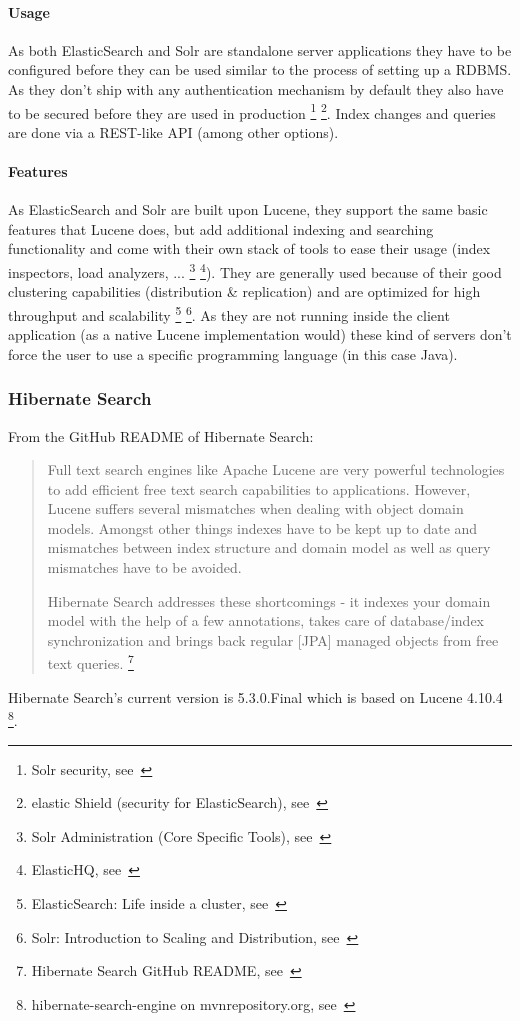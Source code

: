 \paragraph{Usage}
As both ElasticSearch and Solr are standalone server applications they have to be configured before they can be used similar to the process of setting up a RDBMS. As they don't ship with any authentication mechanism by default they also have to be secured before they are used in production \footnote{Solr security, see~\cite{solr_security}} \footnote{elastic Shield (security for ElasticSearch), see~\cite{elasticsearch_security}}. Index changes and queries are done via a REST-like API (among other options).

\paragraph{Features}
As ElasticSearch and Solr are built upon Lucene, they support the same basic features that Lucene does, but add additional indexing and searching functionality and come with their own stack of tools to ease their usage (index inspectors, load analyzers, ... \footnote{Solr Administration (Core Specific Tools), see~\cite{solr_admin}} \footnote{ElasticHQ, see~\cite{elasticsearch_admin}}). They are generally used because of their good clustering capabilities (distribution \& replication) and are optimized for high throughput and scalability \footnote{ElasticSearch: Life inside a cluster, see~\cite{elasticsearch_clustering}} \footnote{Solr: Introduction to Scaling and Distribution, see~\cite{solr_clustering}}. As they are not running inside the client application (as a native Lucene implementation would) these kind of servers don't force the user to use a specific programming language (in this case Java).

\pagebreak

\subsubsection{Hibernate Search}

From the GitHub README of Hibernate Search:
\begin{quote}
Full text search engines like Apache Lucene are very powerful technologies to add efficient free text search capabilities to applications. However, Lucene suffers several mismatches when dealing with object domain models. Amongst other things indexes have to be kept up to date and mismatches between index structure and domain model as well as query mismatches have to be avoided.

Hibernate Search addresses these shortcomings - it indexes your domain model with the help of a few annotations, takes care of database/index synchronization and brings back regular [JPA] managed objects from free text queries. \footnote{Hibernate Search GitHub README, see~\cite{hsearch_source_code_git}}
\end{quote}
\noindent
Hibernate Search's current version is 5.3.0.Final which is based on Lucene 4.10.4 \footnote{hibernate-search-engine on mvnrepository.org, see~\cite{hibernate_search_engine_mvnrepository}}.

